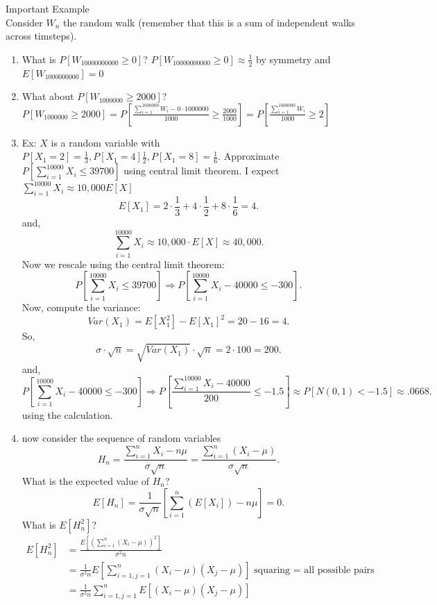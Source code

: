 \documentclass[a4paper]{article}
\begin{document}
\begin{note}{Important Example}\\
  Consider $W_n$ the random walk (remember that this is a sum of independent walks across timsteps). 
  \begin{enumerate}
    \item What is  $P[W_{10000000000} \geq 0]$? $P[W_{10000000000} \geq 0] \approx \frac{1}{2}$ by symmetry and $E[W_{1000000000}] = 0$ 
    \item What about $P[W_{1000000} \geq 2000]$? $P[W_{1000000} \geq 2000] = P[\frac{\sum_{i=1}^{1000000}W_i - 0 \cdot 1000000}{ 1000} \geq \frac{2000}{1000}] =  P[\frac{\sum_{i=1}^{1000000}W_i}{ 1000} \geq 2]$
    \item Ex: $X$ is a random variable with  $P[X_1 = 2] = \frac{1}{3}, P[X_1 = 4] \frac{1}{2}, P[X_1=8]=\frac{1}{6}$. Approximate $P[\sum_{i=1}^{10000} X_i \leq 39700]$ using central limit theorem. I expect $\sum_{i=1}^{10000} X_i \approx 10,000 E[X]$
      \[
        E[X_1] = 2 \cdot \frac{1}{3} + 4 \cdot \frac{1}{2} + 8 \cdot \frac{1}{6} = 4 
      .\] 
      and, 
      \[
      \sum_{i=1}^{10000} X_i \approx 10,000 \cdot E[X] \approx 40,000
      .\] 
      Now we rescale using the central limit theorem:
      \[
        P[\sum_{i=1}^{10000} X_i \leq 39700] \Rightarrow P[\sum_{i=1}^{10000} X_i - 40000 \leq -300]
      .\]
      Now, compute the variance:
      \[
        Var(X_1) = E[X_1^{2}] - E[X_1]^{2} = 20 - 16 =4
      .\] 
      So,
      \[
        \sigma \cdot \sqrt{n} = \sqrt{Var(X_1)} \cdot \sqrt{n} = 2 \cdot 100 = 200    
      .\] 
      and,
      \[
        P[\sum_{i=1}^{10000} X_i - 40000 \leq -300] \Rightarrow P[\frac{\sum_{i=1}^{10000} X_i - 40000 }{200} \leq -1.5] \approx P[N(0,1) < -1.5] \approx .0668 
      .\] 
      using the calculation.
    \item now consider the sequence of random variables
      \[
      H_n = \frac{\sum_{i=1}^{n} X_i - n \mu}{\sigma \sqrt{n}} = \frac{\sum_{i=1}^{n} (X_i - \mu)}{\sigma \sqrt{n}}
      .\] 
      What is the expected value of $H_n$?
       \[
         E[H_n] = \frac{1}{\sigma \sqrt{n}} [\sum_{i=1}^{n} (E[X_i]) - n \mu] = 0
      .\] 
      What is $E[H_n^{2}]$? 
      \begin{align*}
        E[H_n^{2}] &= \frac{E[(\sum_{i=1}^{n}(X_i - \mu))^{2}]}{\sigma^{2} n} \\
                   &= \frac{1}{\sigma^{2} n} E[\sum_{i=1, j=1}^{n} (X_i - \mu) (X_j - \mu)] \text{ squaring = all possible pairs} \\
                   &= \frac{1}{\sigma^{2}n} \sum_{i=1,j=1}^{n} E[(X_i -\mu)(X_j - \mu)] \\

\end{align*}
\end{enumerate}
\end{note}
\end{document}
